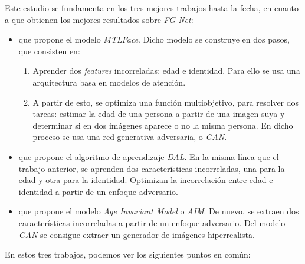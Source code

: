 Este estudio se fundamenta en los tres mejores trabajos hasta la fecha, en cuanto a que obtienen los mejores resultados sobre \textit{FG-Net}:

\begin{itemize}
	\item {} \cite{informatica:best_fgnet_model} que propone el modelo \textit{MTLFace}. Dicho modelo se construye en dos pasos, que consisten en:
	      \begin{enumerate}
		      \item Aprender dos \textit{features} incorreladas: edad e identidad. Para ello se usa una arquitectura basa en modelos de atención.
		      \item A partir de esto, se optimiza una función multiobjetivo, para resolver dos tareas: estimar la edad de una persona a partir de una imagen suya y determinar si en dos imágenes aparece o no la misma persona. En dicho proceso se usa una red generativa adversaria, o \textit{GAN}.
	      \end{enumerate}
	\item {} \cite{informatica:dal} que propone el algoritmo de aprendizaje \textit{DAL}. En la misma línea que el trabajo anterior, se aprenden dos características incorreladas, una para la edad y otra para la identidad. Optimizan la incorrelación entre edad e identidad a partir de un enfoque adversario.
	\item {} \cite{informatica:aim} que propone el modelo \textit{Age Invariant Model} o \textit{AIM}. De nuevo, se extraen dos características incorreladas a partir de un enfoque adversario. Del modelo \textit{GAN} se consigue extraer un generador de imágenes hiperrealista.
\end{itemize}

En estos tres trabajos, podemos ver los siguientes puntos en común:

